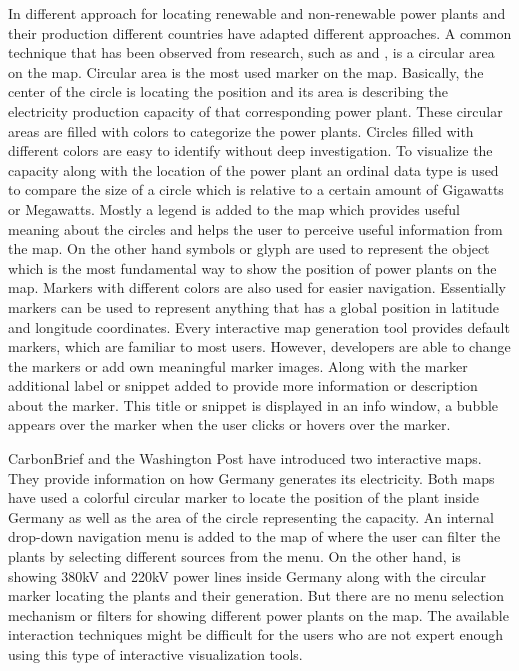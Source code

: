 In different approach for locating renewable and non-renewable power plants and their production 
different countries have adapted different approaches. A common technique that has been observed from research, such as \cite{cbg2016} and \cite{wp2015}, is a circular area on the map. Circular area is the most used marker on the map. Basically, the center of the circle is locating the position and its area is describing the electricity production capacity of that corresponding power plant. These circular areas are filled with colors to categorize the power plants. Circles filled with different colors are easy to identify without deep investigation. To visualize the capacity along with the location of the power plant an ordinal data type is used to compare the size of a circle which is relative to a certain amount of Gigawatts or Megawatts. Mostly a legend is added to the map which provides useful meaning about the circles and helps the user to perceive useful information from the map. On the other hand symbols or glyph are used to represent the object which is the most fundamental way to show the position of power plants on the map. Markers with different colors are also used for easier navigation. Essentially markers can be used to represent anything that has a global position in latitude and longitude coordinates. Every interactive map generation tool provides default markers, which are familiar to most users. However, developers are able to change the markers or add own meaningful marker images. Along with the marker additional label or snippet added to provide more information or description about the marker. This title or snippet is displayed in an info window, a bubble appears over the marker when the user clicks or hovers over the marker.

CarbonBrief \cite{cbg2016} and the Washington Post \cite{gportal2016} have introduced two interactive maps. They provide information on how Germany generates its electricity. Both maps have used a colorful circular marker to locate the position of the plant inside Germany as well as the area of the circle representing the capacity. An internal drop-down navigation menu is added to the map of \cite{cbg2016} where the user can filter the plants by selecting different sources from the menu. On the other hand, \cite{gportal2016} is showing 380kV and 220kV power lines inside Germany along with the circular marker locating the plants and their generation. But there are no menu selection mechanism or filters for showing different power plants on the map. The available interaction techniques might be difficult for the users who are not expert enough using this type of interactive visualization tools. 


